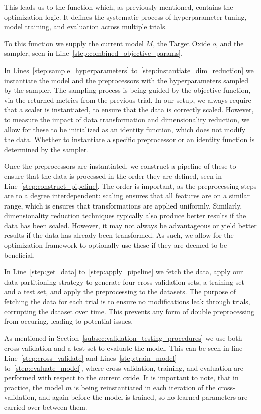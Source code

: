 This leads us to the  function which, as previously mentioned, contains the optimization logic.
It defines the systematic process of hyperparameter tuning, model training, and evaluation across multiple trials.

To this function we supply the current model $M$, the Target Oxide $o$, and the sampler, seen in Line~\ref{step:combined_objective_params}.

In Lines~\ref{step:sample_hyperparameters} to~\ref{step:instantiate_dim_reduction} we instantiate the model and the preprocessors with the hyperparameters sampled by the sampler.
The sampling process is being guided by the objective function, via the returned metrics from the previous trial.
In our setup, we always require that a scaler is instantiated, to ensure that the data is correctly scaled.
However, to measure the impact of data transformation and dimensionality reduction, we allow for these to be initialized as an identity function, which does not modify the data.
Whether to instantiate a specific preprocessor or an identity function is determined by the sampler.

Once the preprocessors are instantiated, we construct a pipeline of these to ensure that the data is processed in the order they are defined, seen in Line~\ref{step:construct_pipeline}.
The order is important, as the preprocessing steps are to a degree interdependent: scaling ensures that all features are on a similar range, which is ensures that transformations are applied uniformly.
Similarly, dimensionality reduction techniques typically also produce better results if the data has been scaled.
However, it may not always be advantageous or yield better results if the data has already been transformed.
As such, we allow for the optimization framework to optionally use these if they are deemed to be beneficial.

In Line~\ref{step:get_data} to~\ref{step:apply_pipeline} we fetch the data, apply our data partitioning strategy to generate four cross-validation sets, a training set and a test set, and apply the preprocessing to the datasets.
The purpose of fetching the data for each trial is to ensure no modifications leak through trials, corrupting the dataset over time.
This prevents any form of double preprocessing from occuring, leading to potential issues.

As mentioned in Section~\ref{subsec:validation_testing_procedures} we use both cross validation and a test set to evaluate the model.
This can be seen in line Line~\ref{step:cross_validate} and Lines~\ref{step:train_model} to~\ref{step:evaluate_model}, where cross validation, training, and evaluation are performed with respect to the current oxide.
It is important to note, that in practice, the model $m$ is being reinstantiated in each iteration of the cross-validation, and again before the model is trained, so no learned parameters are carried over between them.

